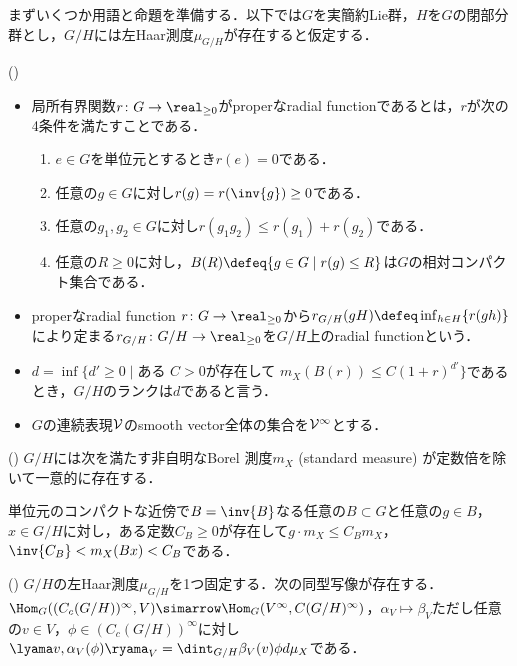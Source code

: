 まずいくつか用語と命題を準備する．以下では$G$を実簡約Lie群，$H$を$G$の閉部分群とし，$G/H$には左Haar測度$\mu_{G/H} $が存在すると仮定する．
\begin{defi*}(\cite{ber88})
  \leavevmode\vspace{-1em}
  \begin{itemize}
  \item 局所有界関数$r\colon G\to \real_{\geq 0} $がproperなradial functionであるとは，$r$が次の4条件を満たすことである．
    \begin{enumerate}
    \item $e\in G$を単位元とするとき$r(e) = 0 $である．
    \item 任意の$g\in G$に対し$r(g) = r(\inv{g})\geq 0  $である．
    \item 任意の$g_1,g_2\in G$に対し$r(g_1g_2)\leq r(g_1) + r(g_2)  $である．
    \item 任意の$R\geq 0$に対し，$B(R)\defeq \{g\in G\mid r(g)\leq R \} $は$G$の相対コンパクト集合である．
    \end{enumerate}
  \item properなradial function $r\colon G\to \real_{\geq 0} $から$r_{G/H}(gH)\defeq \inf_{h\in H}\{r(gh) \}$により定まる${r_{G/H}\colon G/H\to \real_{\geq 0}}$を$G/H$上のradial functionという．
  \item $d = \inf\{d'\geq 0\mid \text{ある } C > 0\text{が存在して }  m_X(B(r))\leq C(1+r)^{d'}\} $であるとき，$G/H$のランクは$d$であると言う．
  \item $G$の連続表現$\cal{V} $のsmooth vector全体の集合を$\cal{V}^{\infty} $とする．
  \end{itemize}
\end{defi*}
\begin{thmdef*}(\cite[p.~683]{ber88})
  $G/H$には次を満たす非自明なBorel 測度$m_X $ (standard measure) が定数倍を除いて一意的に存在する．

  単位元のコンパクトな近傍で$B = \inv{B} $なる任意の$B\subset G$と任意の$g\in B$，$x\in G/H$に対し，ある定数$C_B\geq 0 $が存在して$g\cdot m_X \leq C_B m_X$，$ \inv{C_B} < m_X(Bx) < C_{B}$である．
\end{thmdef*}
\begin{thmdef*}(\cite[p.~678]{ber88})
  $G/H$の左Haar測度$\mu_{G/H} $を1つ固定する．次の同型写像が存在する．$\Hom_{G}((C_c(G/H))^{\infty}, V )\simarrow \Hom_{G}(V^{\infty}, C(G/H)^{\infty}) $，$\alpha_V\mapsto \beta_V$ただし任意の$v\in V$，$\phi \in  (C_c(G/H))^{\infty} $に対し$ \lyama v,\alpha_V(\phi)\ryama_{V} = \dint_{G/H}\beta_V(v)\phi d\mu_X  $である．
\end{thmdef*}


